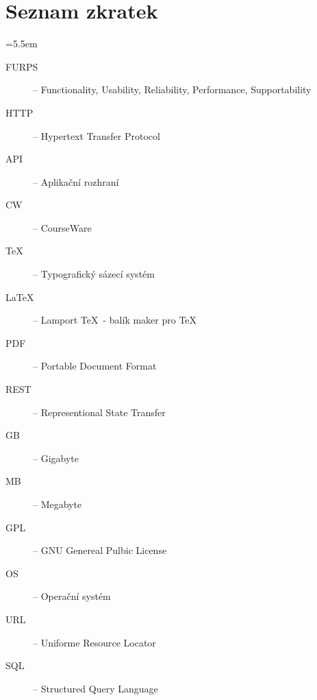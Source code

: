 \appendix

\chapter{Seznam zkratek}

\medskip
\bgroup \leftskip=5.5em

\begin{description}
	
	\item[FURPS] -- Functionality, Usability, Reliability, Performance, Supportability
	
	\item[HTTP] -- Hypertext Transfer Protocol
	
	\item[API] -- Aplikační rozhraní
	
	\item[CW] -- CourseWare
	
	\item[\TeX] -- Typografický sázecí systém
	
	\item[\LaTeX] -- Lamport \TeX\ - balík maker pro \TeX
	
	\item[PDF] -- Portable Document Format
	
	\item[REST] -- Representional State Transfer
	
	\item[GB] -- Gigabyte
	
	\item[MB] -- Megabyte
	
	\item[GPL] -- GNU Genereal Pulbic License
	
	\item[OS] -- Operační systém
	
	\item[URL] -- Uniforme Resource Locator 
	
	\item[SQL] -- Structured Query Language
	
	

\end{description}

\par\egroup